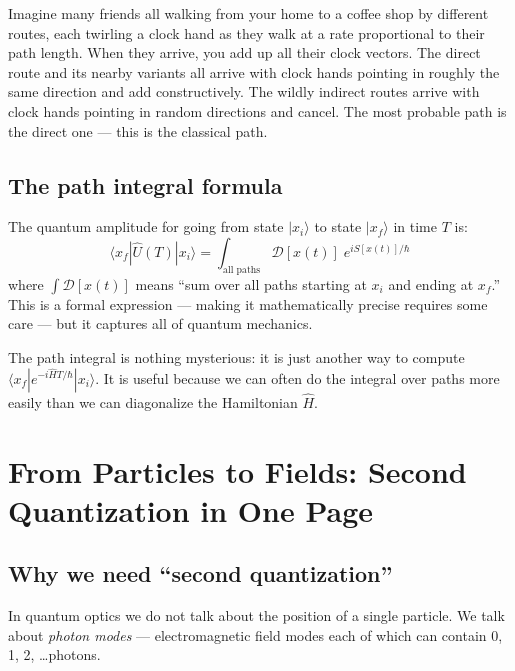 \documentclass[12pt]{article}
\newcommand{\bra}[1]{\langle #1 |}
\newcommand{\ket}[1]{| #1 \rangle}
\begin{document}
\begin{analogy}
Imagine many friends all walking from your home to a coffee shop
by different routes, each twirling a clock hand as they walk at a
rate proportional to their path length. When they arrive, you add
up all their clock vectors. The direct route and its nearby variants
all arrive with clock hands pointing in roughly the same direction
and add constructively. The wildly indirect routes arrive with
clock hands pointing in random directions and cancel. The most
probable path is the direct one --- this is the classical path.
\end{analogy}

\subsection{The path integral formula}

The quantum amplitude for going from state $\ket{x_i}$ to state
$\ket{x_f}$ in time $T$ is:
\begin{equation}
  \bra{x_f}\hat{U}(T)\ket{x_i} =
  \int_{\text{all paths}} \mathcal{D}[x(t)]\;e^{iS[x(t)]/\hbar}
  \label{eq:path_integral}
\end{equation}
where $\int\mathcal{D}[x(t)]$ means ``sum over all paths starting
at $x_i$ and ending at $x_f$.'' This is a formal expression ---
making it mathematically precise requires some care --- but it
captures all of quantum mechanics.

\begin{punchline}
The path integral is nothing mysterious: it is just another way to
compute $\bra{x_f}e^{-i\hat{H}T/\hbar}\ket{x_i}$. It is useful
because we can often do the integral over paths more easily than
we can diagonalize the Hamiltonian $\hat{H}$.
\end{punchline}

\section{From Particles to Fields: Second Quantization in One Page}

\subsection{Why we need ``second quantization''}

In quantum optics we do not talk about the position of a single
particle. We talk about \emph{photon modes} --- electromagnetic field
modes each of which can contain 0, 1, 2, \ldots photons.
\end{document}
